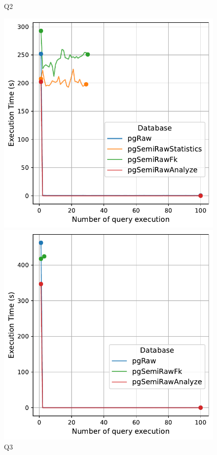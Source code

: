 \begin{figure}[h!]
\begin{minipage}[b]{0.45\linewidth}
    \caption*{Q2}
\end{minipage}
\vspace{0.5cm}
\begin{minipage}[b]{0.45\linewidth}
    \centering
    \includegraphics[width=1.0\linewidth]{charts-eval-exp-time-stat/execution_time_db_type_Q3.pdf}
    \caption*{Q3}
\end{minipage}
\hfill
\begin{minipage}[b]{0.45\linewidth}
    \centering
    \includegraphics[width=1.0\linewidth]{charts-eval-exp-time-stat/execution_time_db_type_Q4.pdf}

\end{minipage}
\end{figure}
